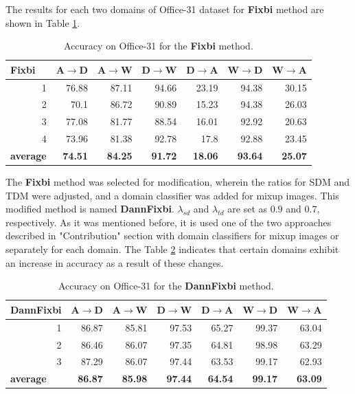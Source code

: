 The results for each two domains of Office-31 dataset for \textbf{Fixbi} method are shown in Table \ref{tab:fixbi}.\\
\begin{table}[h]
\centering
\caption{Accuracy on Office-31 for the \textbf{Fixbi} method.}
\label{tab:fixbi}
\begin{tabular}{|r|r|r|r|r|r|r|}
\hline
\multicolumn{1}{|l|}{Fixbi} & \multicolumn{1}{l|}{A$\rightarrow$D} & \multicolumn{1}{l|}{A$\rightarrow$W} & \multicolumn{1}{l|}{D$\rightarrow$W} & \multicolumn{1}{l|}{D$\rightarrow$A} & \multicolumn{1}{l|}{W$\rightarrow$D} & \multicolumn{1}{l|}{W$\rightarrow$A} \\ \hline
1 & 76.88 & 87.11 & 94.66 & 23.19 & 94.38 & 30.15 \\ \hline
2 & 70.1 & 86.72 & 90.89 & 15.23 & 94.38 & 26.03 \\ \hline
3 & 77.08 & 81.77 & 88.54 & 16.01 & 92.92 & 20.63 \\ \hline
4 & 73.96 & 81.38 & 92.78 & 17.8 & 92.88 & 23.45 \\ \hline
\multicolumn{1}{|l|}{\textbf{average}} & \textbf{74.51} & \textbf{84.25} & \textbf{91.72} & \textbf{18.06} & \textbf{93.64} & \textbf{25.07} \\ \hline
\end{tabular}
\end{table}

The \textbf{Fixbi} method was selected for modification, wherein the ratios for SDM and TDM were adjusted, and a domain classifier was added for mixup images. This modified method is named \textbf{DannFixbi}. $\lambda_{sd}$ and $\lambda_{td}$ are set as $0.9$ and $0.7$, respectively. As it was mentioned before, it is used one of the two approaches described in "Contribution" section with domain classifiers for mixup images or separately for each domain. The Table \ref{tab:dann_fixbi} indicates that certain domains exhibit an increase in accuracy as a result of these changes.


\begin{table}[h]
\centering
\caption{Accuracy on Office-31 for the \textbf{DannFixbi} method.}
\label{tab:dann_fixbi}
\begin{tabular}{|r|r|r|r|r|r|r|}
\hline
\multicolumn{1}{|l|}{DannFixbi} & \multicolumn{1}{l|}{A$\rightarrow$D} & \multicolumn{1}{l|}{A$\rightarrow$W} & \multicolumn{1}{l|}{D$\rightarrow$W} & \multicolumn{1}{l|}{D$\rightarrow$A} & \multicolumn{1}{l|}{W$\rightarrow$D} & \multicolumn{1}{l|}{W$\rightarrow$A} \\ \hline
1 & 86.87 & 85.81 & 97.53 & 65.27 & 99.37 & 63.04 \\ \hline
2 & 86.46 & 86.07 & 97.35 & 64.81 & 98.98 & 63.29 \\ \hline
3 & 87.29 & 86.07 & 97.44 & 63.53 & 99.17 & 62.93 \\ \hline
\multicolumn{1}{|l|}{\textbf{average}} & \textbf{86.87} & \textbf{85.98} & \textbf{97.44} & \textbf{64.54} & \textbf{99.17} & \textbf{63.09} \\ \hline
\end{tabular}
\end{table}

